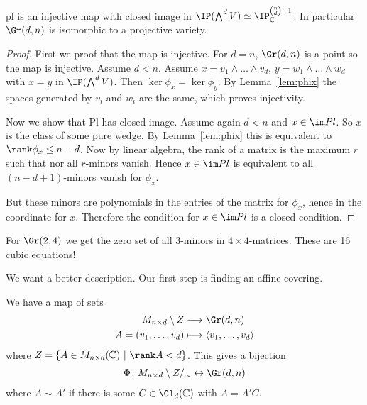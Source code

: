 \documentclass{skript}
\begin{document}
\begin{thm}\label{def:plembed}
    pl is an injective map with closed image in $\IP(\bigwedge^d V)\simeq \IP_{\IC}^{\binom nd-1}$. 
    In particular $\Gr(d,n)$ is isomorphic to a projective variety.
\end{thm}
\begin{proof}
    First we proof that the map is injective.
    For $d=n$, $\Gr(d,n)$ is a point so the map is injective.
    Assume $d<n$. Assume $x = v_1\wedge \dots \wedge v_d$, $y = w_1\wedge \dots \wedge w_d$ with $x=y$ in $\IP(\bigwedge^d V)$. Then $\ker \phi_x = \ker \phi_y$.
    By Lemma~\ref{lem:phix} the spaces generated by $v_i$ and $w_i$ are the same, which proves injectivity.

    Now we show that Pl has closed image.
    Assume again $d< n$ and $x\in \im Pl$. 
    So $x$ is the class of some pure wedge.
    By Lemma~\ref{lem:phix} this is equivalent to $\rank \phi_x\leq n-d$. 
    Now by linear algebra, the rank of a matrix is the maximum $r$ such that nor all $r$-minors vanish.
    Hence $x\in \im Pl$ is equivalent to all $(n-d+1)$-minors vanish for $\phi_x$.
    
    But these minors are polynomials in the entries of the matrix for $\phi_x$, hence in the coordinate for $x$.
    Therefore the condition for $x\in \im Pl$ is a closed condition.
\end{proof}

\begin{bsp}
    For $\Gr(2,4)$ we get the zero set of all 3-minors in $4\times 4$-matrices.
    These are 16 cubic equations!
\end{bsp}

We want a better description.
Our first step is finding an affine covering.

We have a map of sets
\begin{align*}
    M_{n\times d} \setminus Z &\longrightarrow \Gr(d,n)\\
    A=(v_1,\dots, v_d) &\longmapsto \langle v_1,\dots, v_d\rangle
\end{align*}
where $Z=\left\{A\in M_{n\times d}(\IC) \such \rank A< d\right\}$.
This gives a bijection
\begin{align*}
   \Phi\colon M_{n\times d} \setminus Z /_\sim \leftrightarrow \Gr(d,n)
\end{align*}
where $A\sim A'$ if there is some $C\in \Gl_d(\IC)$ with $A=A'C$.
\end{document}
